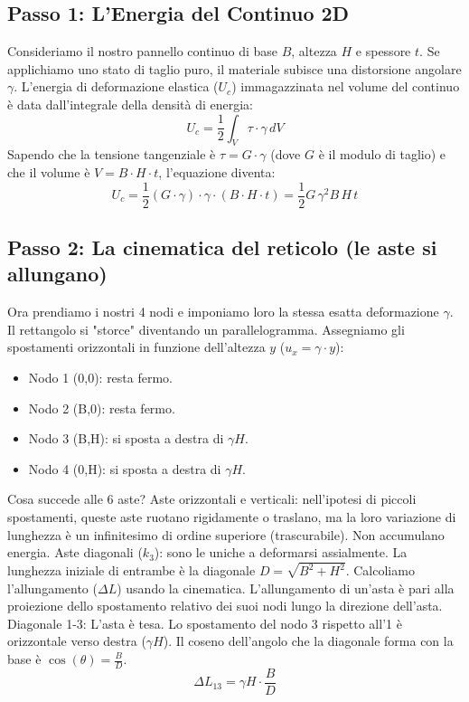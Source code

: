 \documentclass[a4paper]{article}
\begin{document}
\dotfill


\subsection{Passo 1: L'Energia del Continuo 2D}
Consideriamo il nostro pannello continuo di base $B$, altezza $H$ e spessore $t$.
Se applichiamo uno stato di taglio puro, il materiale subisce una distorsione angolare $\gamma$.
L'energia di deformazione elastica ($U_c$) immagazzinata nel volume del continuo è data dall'integrale della densità di energia:
$$U_c = \frac{1}{2} \int_V \tau \cdot \gamma \, dV$$
Sapendo che la tensione tangenziale è $\tau = G \cdot \gamma$ (dove $G$ è il modulo di taglio) e che il volume è $V = B \cdot H \cdot t$, l'equazione diventa:
$$U_c = \frac{1}{2} (G \cdot \gamma) \cdot \gamma \cdot (B \cdot H \cdot t) = \frac{1}{2} G \, \gamma^2 B \, H \, t$$
\subsection{Passo 2: La cinematica del reticolo (le aste si allungano)}
Ora prendiamo i nostri 4 nodi e imponiamo loro la stessa esatta deformazione $\gamma$. Il rettangolo si "storce" diventando un parallelogramma.
Assegniamo gli spostamenti orizzontali in funzione dell'altezza $y$ ($u_x = \gamma \cdot y$):
\begin{itemize}
\item Nodo 1 (0,0): resta fermo.
\item Nodo 2 (B,0): resta fermo.
\item Nodo 3 (B,H): si sposta a destra di $\gamma H$.
\item Nodo 4 (0,H): si sposta a destra di $\gamma H$.
\end{itemize}
Cosa succede alle 6 aste?
Aste orizzontali e verticali: nell'ipotesi di piccoli spostamenti, queste aste ruotano rigidamente o traslano, ma la loro variazione di lunghezza è un infinitesimo di ordine superiore (trascurabile). Non accumulano energia.
Aste diagonali ($k_3$): sono le uniche a deformarsi assialmente. La lunghezza iniziale di entrambe è la diagonale $D = \sqrt{B^2+H^2}$.
Calcoliamo l'allungamento ($\Delta L$) usando la cinematica. L'allungamento di un'asta è pari alla proiezione dello spostamento relativo dei suoi nodi lungo la direzione dell'asta.
Diagonale 1-3: L'asta è tesa. Lo spostamento del nodo 3 rispetto all'1 è orizzontale verso destra ($\gamma H$). Il coseno dell'angolo che la diagonale forma con la base è $\cos(\theta) = \frac{B}{D}$.
$$\Delta L_{13} = \gamma H \cdot \frac{B}{D}$$
\end{document}

